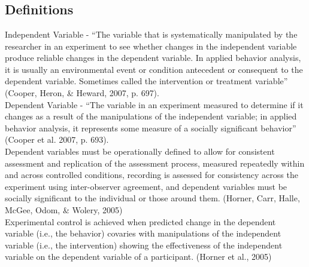 \section[\fourbThree{}]{\fourbThree{}%
              }
              
              

\subsection{Definitions} 
Independent Variable - ``The variable that is systematically manipulated by the researcher in an experiment to see whether changes in the independent variable produce reliable changes in the dependent variable. In applied behavior analysis, it is usually an environmental event or condition antecedent or consequent to the dependent variable. Sometimes called the intervention or treatment variable'' (Cooper, Heron, \& Heward, 2007, p. 697).\\

Dependent Variable - ``The variable in an experiment measured to determine if it changes as a result of the manipulations of the independent variable; in applied behavior analysis, it represents some measure of a socially significant behavior'' (Cooper et al. 2007, p. 693).\\

Dependent variables must be operationally defined to allow for consistent assessment and replication of the assessment process, measured repeatedly within and across controlled conditions, recording is assessed for consistency across the experiment using inter-observer agreement, and dependent variables must be socially significant to the individual or those around them. (Horner, Carr, Halle, McGee, Odom, \& Wolery, 2005)\\

Experimental control is achieved when predicted change in the dependent variable (i.e., the behavior) covaries with manipulations of the independent variable (i.e., the intervention) showing the effectiveness of the independent variable on the dependent variable of a participant. (Horner et al., 2005)
%
